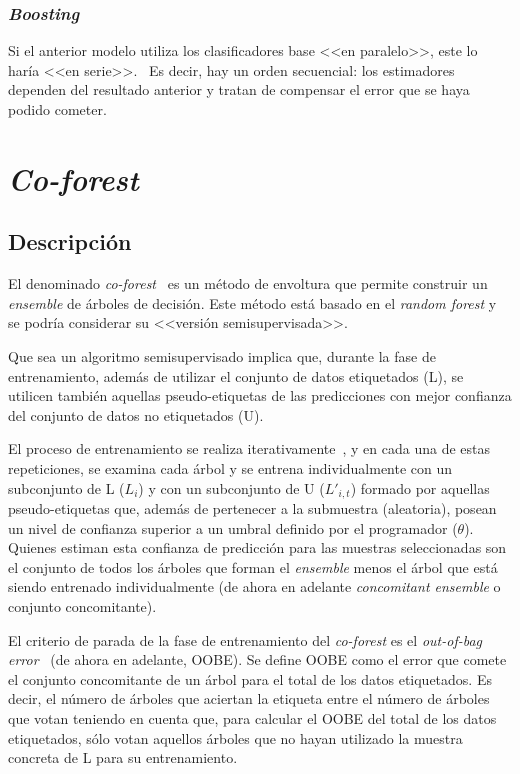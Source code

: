 \subsubsection{\textit{Boosting}}

Si el anterior modelo utiliza los clasificadores base <<en paralelo>>, este lo haría <<en serie>>.~\cite{engelen2018thesis} Es decir, hay un orden secuencial: los estimadores dependen del resultado anterior y tratan de compensar el error que se haya podido cometer.


\section{\textit{Co-forest}}

\subsection{Descripción}

El denominado \textit{co-forest}~\cite{originalCoForest2007} es un método de envoltura que permite construir un \textit{ensemble} de árboles de decisión. Este método está basado en el \textit{random forest} y se podría considerar su <<versión semisupervisada>>. 

Que sea un algoritmo semisupervisado implica que, durante la fase de entrenamiento, además de utilizar el conjunto de datos etiquetados (L), se utilicen también aquellas pseudo-etiquetas de las predicciones con mejor confianza del conjunto de datos no etiquetados (U).

El proceso de entrenamiento se realiza iterativamente~\cite{engelen2018thesis}, y en cada una de estas repeticiones, se examina cada árbol y se entrena individualmente con un subconjunto de L ($L_{i}$) y con un subconjunto de U ($L'_{i,t}$) formado por aquellas pseudo-etiquetas que, además de pertenecer a la submuestra (aleatoria), posean un nivel de confianza superior a un umbral definido por el programador ($\theta$). Quienes estiman esta confianza de predicción para las muestras seleccionadas son el conjunto de todos los árboles que forman el \textit{ensemble} menos el árbol que está siendo entrenado individualmente (de ahora en adelante \textit{concomitant ensemble} o conjunto concomitante).

El criterio de parada de la fase de entrenamiento del \textit{co-forest} es el \textit{out-of-bag error}~\cite{zhou2021SemisupervisedRecommendationAttack} (de ahora en adelante, OOBE). Se define OOBE como el error que comete el conjunto concomitante de un árbol para el total de los datos etiquetados. Es decir, el número de árboles que aciertan la etiqueta entre el número de árboles que votan teniendo en cuenta que, para calcular el OOBE del total de los datos etiquetados, sólo votan aquellos árboles que no hayan utilizado la muestra concreta de L para su entrenamiento.


